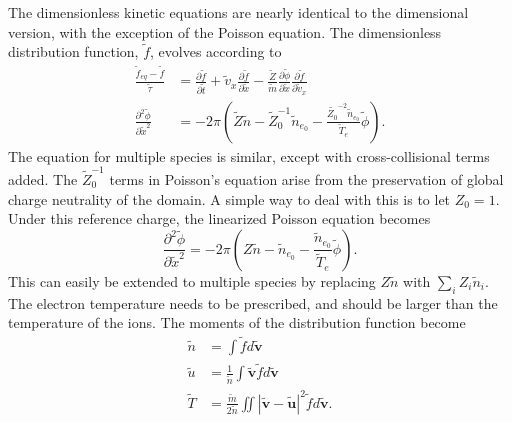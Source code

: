 \documentclass{article}
\begin{document}
The dimensionless kinetic equations are nearly identical to the dimensional version, with the exception of the Poisson equation. The dimensionless distribution function, $\tilde{f}$, evolves according to
\begin{align*}
\frac{\tilde{f}_{eq}-\tilde{f}}{\tilde{\tau}}&=\frac{\partial\tilde{f}}{\partial\tilde{t}} + \tilde{v}_x\frac{\partial\tilde{f}}{\partial\tilde{x}} - \frac{\tilde{Z}}{\tilde{m}}\frac{\partial \tilde{\phi}}{\partial\tilde{x}}\frac{\partial\tilde{f}}{\partial\tilde{v}_x}\\
\frac{\partial^2\tilde{\phi}}{\partial \tilde{x}^2}	&= -2\pi\left(\tilde{Z}\tilde{n} - \tilde{Z}_0^{-1}\tilde{n}_{e_0} - \frac{\tilde{Z_0}^{-2}\tilde{n}_{e_0}}{\tilde{T}_e}\tilde{\phi}\right).
\end{align*}
The equation for multiple species is similar, except with cross-collisional terms added. The $\tilde{Z}_0^{-1}$ terms in Poisson's equation arise from the preservation of global charge neutrality of the domain. A simple way to deal with this is to let $Z_0 = 1$. Under this reference charge, the linearized Poisson equation becomes
\begin{equation*}
\frac{\partial^2\tilde{\phi}}{\partial \tilde{x}^2} = -2\pi\left(Z\tilde{n} - \tilde{n}_{e_0} - \frac{\tilde{n}_{e_0}}{\tilde{T}_e}\tilde{\phi}\right).
\end{equation*}
This can easily be extended to multiple species by replacing $Z\tilde{n}$ with $\sum_{i}Z_i\tilde{n}_i$. The electron temperature needs to be prescribed, and should be larger than the temperature of the ions. The moments of the distribution function become
\begin{align*}
\tilde{n} &= \int\tilde{f}d\tilde{\mathbf{v}} \\
\tilde{u} &= \frac{1}{\tilde{n}}\int\tilde{\mathbf{v}}\tilde{f}d\tilde{\mathbf{v}} \\
\tilde{T} &= \frac{\tilde{m}}{2\tilde{n}}\iint\left|\tilde{\mathbf{v}}-\tilde{\mathbf{u}}\right|^2\tilde{f}d\tilde{\mathbf{v}}.
\end{align*}
\end{document}

